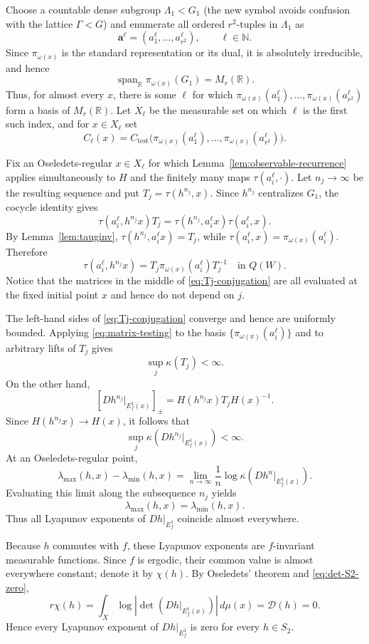 \documentclass[11pt]{amsart}
\numberwithin{equation}{section}
\theoremstyle{plain}
\begin{document}
Choose a countable dense subgroup $\Lambda_1<G_1$ (the new symbol
avoids confusion with the lattice $\Gamma<G$) and enumerate all
ordered $r^2$-tuples in $\Lambda_1$ as
\[
\mathbf a^\ell=(a_1^\ell,\ldots,a_{r^2}^\ell),
\qquad \ell\in\mathbb N.
\]
Since $\pi_{\omega(x)}$ is the standard representation or its dual, it is
absolutely irreducible, and hence
\[
\operatorname{span}_{\mathbb R}\pi_{\omega(x)}(G_1)=M_r(\mathbb R).
\]
Thus, for almost every $x$, there is some $\ell$ for which
$\pi_{\omega(x)}(a_1^\ell),\ldots,
\pi_{\omega(x)}(a_{r^2}^\ell)$ form a basis of
$M_r(\mathbb R)$. Let $X_\ell$ be the measurable set on which $\ell$ is the
first such index, and for $x\in X_\ell$ set
\[
C_\ell(x)=
C_{\mathrm{test}}\bigl(\pi_{\omega(x)}(a_1^\ell),\ldots,
       \pi_{\omega(x)}(a_{r^2}^\ell)\bigr).
\]


Fix an Oseledets-regular $x\in X_\ell$ for which
Lemma~\ref{lem:observable-recurrence} applies simultaneously to
$H$ and the finitely many maps $\tau(a_i^\ell,\cdot)$.  Let
$n_j\to\infty$ be the resulting sequence and put
$T_j=\tau(h^{n_j},x)$. Since $h^{n_j}$
centralizes $G_1$, the cocycle identity gives
\[
\tau(a_i^\ell,h^{n_j}x)T_j
=
\tau(h^{n_j},a_i^\ell x)\tau(a_i^\ell,x).
\]
By Lemma~\ref{lem:tauginv},
$\tau(h^{n_j},a_i^\ell x)=T_j$, while
$\tau(a_i^\ell,x)=\pi_{\omega(x)}(a_i^\ell)$. Therefore
\begin{equation}\label{eq:Tj-conjugation}
\tau(a_i^\ell,h^{n_j}x)
=
T_j\pi_{\omega(x)}(a_i^\ell)T_j^{-1}
\quad\text{in }Q(W).
\end{equation}
Notice that the matrices in the middle of
\eqref{eq:Tj-conjugation} are all evaluated at the fixed initial point
$x$ and hence do not depend on $j$.

The left-hand sides of \eqref{eq:Tj-conjugation} converge and hence are
uniformly bounded. Applying
\eqref{eq:matrix-testing} to the basis
$\{\pi_{\omega(x)}(a_i^\ell)\}$ and to arbitrary lifts of $T_j$ gives
\[
\sup_j\kappa(T_j)<\infty.
\]
On the other hand,
\[
[Dh^{n_j}|_{E_f^1(x)}]_{\pm}
=H(h^{n_j}x)T_jH(x)^{-1}.
\]
Since $H(h^{n_j}x)\to H(x)$, it follows that
\[
\sup_j\kappa\left(Dh^{n_j}|_{E_f^1(x)}\right)<\infty.
\]
At an Oseledets-regular point,
\[
\lambda_{\max}(h,x)-\lambda_{\min}(h,x)
=
\lim_{n\to\infty}\frac1n
\log\kappa\left(Dh^n|_{E_f^1(x)}\right).
\]
Evaluating this limit along the subsequence $n_j$ yields
\[
\lambda_{\max}(h,x)=\lambda_{\min}(h,x).
\]
Thus all Lyapunov exponents of $Dh|_{E_f^1}$ coincide almost
everywhere.

Because $h$ commutes with $f$, these Lyapunov exponents are
$f$-invariant measurable functions. Since $f$ is ergodic, their common
value is almost everywhere constant; denote it by $\chi(h)$. By
Oseledets' theorem and \eqref{eq:det-S2-zero},
\[
r\chi(h)
=
\int_X\log\left|
\det\left(Dh|_{E_f^1(x)}\right)\right|\,d\mu(x)
=
\mathcal D(h)=0.
\]
Hence every Lyapunov exponent of $Dh|_{E_f^1}$ is zero for every
$h\in S_2$.
\end{document}
